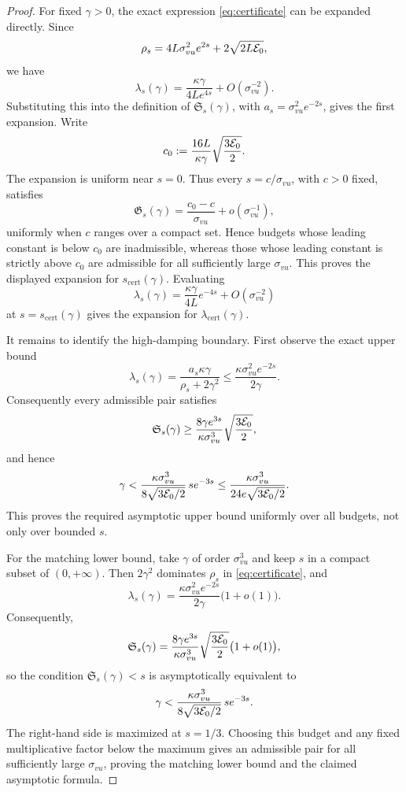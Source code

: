 \begin{proof}
For fixed $\gamma>0$, the exact expression \eqref{eq:certificate}
can be expanded directly. Since
\[
\rho_s=4L\sigma_{vu}^2e^{2s}
+2\sqrt{2L\mathcal E_0},
\]
we have
\[
\lambda_s(\gamma)
=
\frac{\kappa\gamma}{4Le^{4s}}
+O(\sigma_{vu}^{-2}).
\]
Substituting this into the definition of \(\mathfrak S_s(\gamma)\), with
\(a_s=\sigma_{vu}^2e^{-2s}\), gives the first expansion.
Write
\[
c_0:=\frac{16L}{\kappa\gamma}
\sqrt{\frac{3\mathcal E_0}{2}}.
\]
The expansion is uniform near \(s=0\).  Thus every
\(s=c/\sigma_{vu}\), with \(c>0\) fixed, satisfies
\[
\mathfrak G_s(\gamma)
=\frac{c_0-c}{\sigma_{vu}}+o(\sigma_{vu}^{-1}),
\]
uniformly when \(c\) ranges over a compact set.  Hence budgets whose leading
constant is below \(c_0\) are inadmissible, whereas those whose leading
constant is strictly above \(c_0\) are admissible for all sufficiently large
\(\sigma_{vu}\).  This proves the displayed expansion for
\(s_{\mathrm{cert}}(\gamma)\).  Evaluating
\[
\lambda_s(\gamma)
=
\frac{\kappa\gamma}{4L}e^{-4s}
+O(\sigma_{vu}^{-2})
\]
at \(s=s_{\mathrm{cert}}(\gamma)\) gives the expansion for
\(\lambda_{\mathrm{cert}}(\gamma)\).

It remains to identify the high-damping boundary.  First observe the exact
upper bound
\[
\lambda_s(\gamma)
=\frac{a_s\kappa\gamma}{\rho_s+2\gamma^2}
\le\frac{\kappa\sigma_{vu}^2e^{-2s}}{2\gamma}.
\]
Consequently every admissible pair satisfies
\[
\mathfrak S_s(\gamma)
\ge
\frac{8\gamma e^{3s}}{\kappa\sigma_{vu}^3}
\sqrt{\frac{3\mathcal E_0}{2}},
\]
and hence
\[
\gamma
<
\frac{\kappa\sigma_{vu}^3}{8\sqrt{3\mathcal E_0/2}}\,s e^{-3s}
\le
\frac{\kappa\sigma_{vu}^3}{24e\sqrt{3\mathcal E_0/2}}.
\]
This proves the required asymptotic upper bound uniformly over all budgets,
not only over bounded \(s\).

For the matching lower bound, take \(\gamma\) of order
\(\sigma_{vu}^3\) and keep \(s\) in a compact subset of \((0,+\infty)\).
Then $2\gamma^2$ dominates $\rho_s$ in \eqref{eq:certificate}, and
\[
\lambda_s(\gamma)
=
\frac{\kappa\sigma_{vu}^2e^{-2s}}{2\gamma}
\bigl(1+o(1)\bigr).
\]
Consequently,
\[
\mathfrak S_s(\gamma)
=
\frac{8\gamma e^{3s}}{\kappa\sigma_{vu}^3}
\sqrt{\frac{3\mathcal E_0}{2}}
\bigl(1+o(1)\bigr),
\]
so the condition \(\mathfrak S_s(\gamma)<s\) is asymptotically equivalent to
\[
\gamma
<
\frac{\kappa\sigma_{vu}^3}{8\sqrt{3\mathcal E_0/2}}\,
s e^{-3s}.
\]
The right-hand side is maximized at \(s=1/3\).  Choosing this budget and any
fixed multiplicative factor below the maximum gives an admissible pair for all
sufficiently large \(\sigma_{vu}\), proving the matching lower bound and the
claimed asymptotic formula.
\end{proof}

